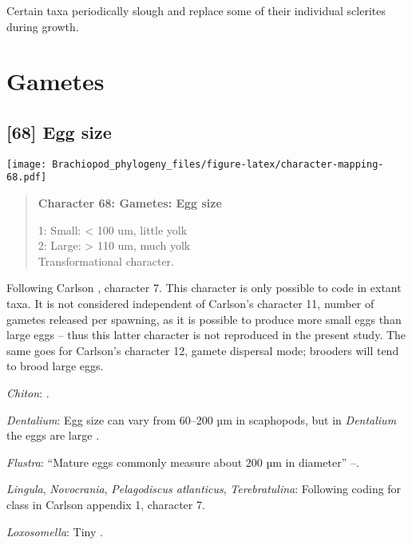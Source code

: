 \documentclass[openany]{book}
\theoremstyle{definition}
\theoremstyle{definition}
\theoremstyle{definition}
\theoremstyle{remark}
\begin{document}
Certain taxa periodically slough and replace some of their individual
sclerites during growth.

\section{Gametes}\label{gametes}

\subsection*{{[}68{]} Egg size}\label{egg-size}

\texttt{[image: Brachiopod\_phylogeny\_files/figure-latex/character-mapping-68.pdf]}

\begin{quote}
\textbf{Character 68: Gametes: Egg size}

1: Small: \textless{} 100 um, little yolk\\
2: Large: \textgreater{} 110 um, much yolk\\
Transformational character.
\end{quote}

Following Carlson \citeyearpar{Carlson1995Phylogeneticrelationships},
character 7. This character is only possible to code in extant taxa. It
is not considered independent of Carlson's character 11, number of
gametes released per spawning, as it is possible to produce more small
eggs than large eggs -- thus this latter character is not reproduced in
the present study. The same goes for Carlson's character 12, gamete
dispersal mode; brooders will tend to brood large eggs.

\hypertarget{Chiton-coding-68}{}
\emph{Chiton}: \citet{BucklandNicks1988}.

\hypertarget{Dentalium-coding-68}{}
\emph{Dentalium}: Egg size can vary from 60--200 µm in scaphopods, but
in \emph{Dentalium} the eggs are large \citep{DufresneDube1983}.

\hypertarget{Flustra-coding-68}{}
\emph{Flustra}: ``Mature eggs commonly measure about 200 µm in
diameter'' --.

\hypertarget{Lingula-coding-68}{}
\emph{Lingula}, \emph{Novocrania}, \emph{Pelagodiscus atlanticus},
\emph{Terebratulina}: Following coding for class in Carlson
\citeyearpar{Carlson1995Phylogeneticrelationships} appendix 1, character
7.

\hypertarget{Loxosomella-coding-68}{}
\emph{Loxosomella}: Tiny \citep{Nielsen1966}.
\end{document}
